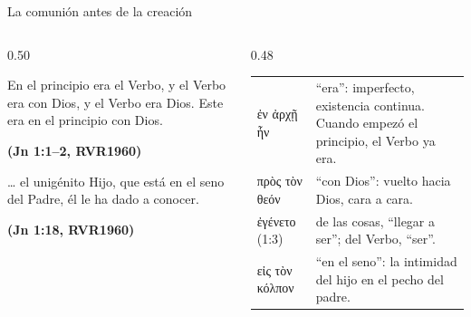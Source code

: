 \documentclass[hyperref={bookmarks=false},aspectratio=169]{beamer}
\newcommand{\grc}[1]{\foreignlanguage{ancientgreek}{#1}}
\newcommand{\fuente}[1]{\par\hfill{\upshape\bfseries\footnotesize\textcolor{azul}{#1}}}
\begin{document}
\begin{frame}{La comunión antes de la creación}
\begin{columns}[t,onlytextwidth]
\begin{column}{0.50\textwidth}
\begin{cita}En el principio era el Verbo, y el Verbo era con Dios, y el Verbo era Dios. Este era en el principio con Dios.\fuente{(Jn 1:1--2, RVR1960)}\end{cita}
\begin{cita}\ldots{} el unigénito Hijo, que está en el seno del Padre, él le ha dado a conocer.\fuente{(Jn 1:18, RVR1960)}\end{cita}
\end{column}
\begin{column}{0.48\textwidth}\scriptsize\renewcommand{\arraystretch}{1.12}
\begin{tabular}{@{}>{\RaggedRight\arraybackslash}p{2.0cm}>{\RaggedRight\arraybackslash}p{3.5cm}@{}}
\toprule
\grc{ἐν ἀρχῇ ἦν} & ``era'': imperfecto, existencia continua. Cuando empezó el principio, el Verbo ya era. \\
\grc{πρὸς τὸν θεόν} & ``con Dios'': vuelto hacia Dios, cara a cara. \\
\grc{ἐγένετο} (1:3) & de las cosas, ``llegar a ser''; del Verbo, ``ser''. \\
\grc{εἰς τὸν κόλπον} & ``en el seno'': la intimidad del hijo en el pecho del padre. \\
\bottomrule
\end{tabular}
\end{column}
\end{columns}
\end{frame}
\end{document}
